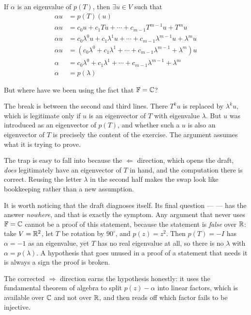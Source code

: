 \begin{xrcs}
\begin{failedattempt}
    \Rightarrowdirection If $\alpha$ is an eigenvalue of $p(T)$, then $\exists u \in V$ such that
    \begin{equation}
      \begin{aligned}
        \alpha u &= p(T)(u)  \\
        \alpha u &= c_0 u + c_1 T u + \cdots + c_{m-1} T^{m-1} u + T^m u \\
        \alpha u &= c_0 \lambda^0 u + c_1 \lambda^1 u + \cdots + c_{m-1} \lambda^{m-1} u + \lambda ^m u \\
        \alpha u &= (c_0 \lambda^0 + c_1 \lambda^1 + \cdots + c_{m-1} \lambda^{m-1} + \lambda ^m ) u \\
        \alpha   &= c_0 \lambda^0 + c_1 \lambda^1 + \cdots + c_{m-1} \lambda^{m-1} + \lambda ^m \\
        \alpha   &= p(\lambda)
      \end{aligned}
    \end{equation}

    But where have we been using the fact that $\mathbb{F} = \mathbb{C}$?
  \end{failedattempt}

  \begin{ainote}
    The break is between the second and third lines. There $T^k u$ is replaced by $\lambda^k u$, which is legitimate only if $u$ is an eigenvector of $T$ with eigenvalue $\lambda$. But $u$ was introduced as an eigenvector of $p(T)$, and whether such a $u$ is also an eigenvector of $T$ is precisely the content of the exercise. The argument assumes what it is trying to prove.

    The trap is easy to fall into because the $\Leftarrow$ direction, which opens the draft, \emph{does} legitimately have an eigenvector of $T$ in hand, and the computation there is correct. Reusing the letter $\lambda$ in the second half makes the swap look like bookkeeping rather than a new assumption.

    It is worth noticing that the draft diagnoses itself. Its final question ---  --- has the answer \emph{nowhere}, and that is exactly the symptom. Any argument that never uses $\mathbb{F} = \mathbb{C}$ cannot be a proof of this statement, because the statement is \emph{false} over $\mathbb{R}$: take $V = \mathbb{R}^2$, let $T$ be rotation by $90^\circ$, and $p(z) = z^2$. Then $p(T) = -I$ has $\alpha = -1$ as an eigenvalue, yet $T$ has no real eigenvalue at all, so there is no $\lambda$ with $\alpha = p(\lambda)$. A hypothesis that goes unused in a proof of a statement that needs it is always a sign the proof is broken.

    The corrected $\Rightarrow$ direction earns the hypothesis honestly: it uses the fundamental theorem of algebra to split $p(z) - \alpha$ into linear factors, which is available over $\mathbb{C}$ and not over $\mathbb{R}$, and then reads off which factor fails to be injective.
  \end{ainote}
\end{xrcs}

